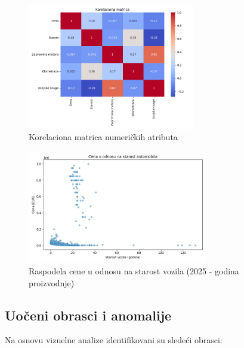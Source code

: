\documentclass[a4paper,12pt]{article}
\begin{document}
\begin{figure}[H]
    \centering
    \includegraphics[width=0.65\textwidth]{corr_matrix.png}
    \caption{Korelaciona matrica numeričkih atributa}
    \label{fig:corr_matrix}
\end{figure}

\begin{figure}[H]
    \centering
    \includegraphics[width=0.7\textwidth]{scatter_starost_vs_cena.png}
    \caption{Raspodela cene u odnosu na starost vozila (2025 - godina proizvodnje)}
    \label{fig:starost_vs_cena}
\end{figure}

\subsection{Uočeni obrasci i anomalije}

Na osnovu vizuelne analize identifikovani su sledeći obrasci:
\end{document}
